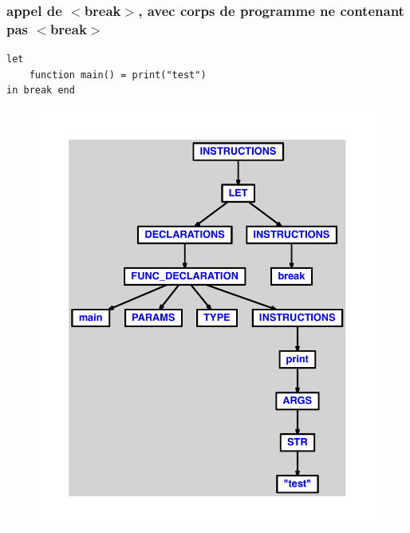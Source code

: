\documentclass{article}
\begin{document}
\subsubsection{appel de $ < $break$ > $, avec corps de programme ne contenant pas $ < $break$ > $}
\begin{lstlisting}
let
	function main() = print("test")
in break end
\end{lstlisting}
\newpage
\begin{figure}[H]
\centering
\includegraphics[max width=\textwidth]{ast/ast_13.pdf}
\end{figure}
\newpage
\end{document}
